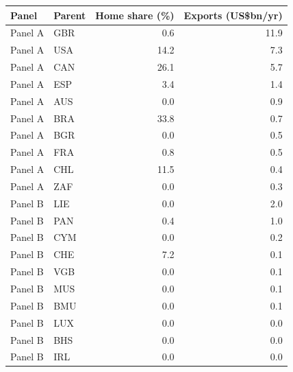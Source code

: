 \begin{tabular}{llrr}
\toprule
Panel & Parent & Home share (\%) & Exports (US\$bn/yr) \\
\midrule
Panel A & GBR & 0.6 & 11.9 \\
Panel A & USA & 14.2 & 7.3 \\
Panel A & CAN & 26.1 & 5.7 \\
Panel A & ESP & 3.4 & 1.4 \\
Panel A & AUS & 0.0 & 0.9 \\
Panel A & BRA & 33.8 & 0.7 \\
Panel A & BGR & 0.0 & 0.5 \\
Panel A & FRA & 0.8 & 0.5 \\
Panel A & CHL & 11.5 & 0.4 \\
Panel A & ZAF & 0.0 & 0.3 \\
\midrule
Panel B & LIE & 0.0 & 2.0 \\
Panel B & PAN & 0.4 & 1.0 \\
Panel B & CYM & 0.0 & 0.2 \\
Panel B & CHE & 7.2 & 0.1 \\
Panel B & VGB & 0.0 & 0.1 \\
Panel B & MUS & 0.0 & 0.1 \\
Panel B & BMU & 0.0 & 0.1 \\
Panel B & LUX & 0.0 & 0.0 \\
Panel B & BHS & 0.0 & 0.0 \\
Panel B & IRL & 0.0 & 0.0 \\
\bottomrule
\end{tabular}
